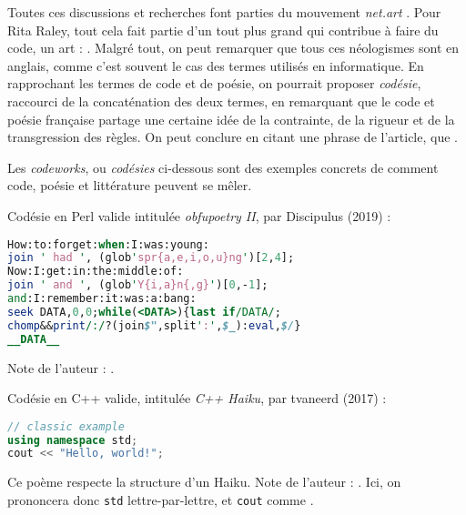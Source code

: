 \documentclass[12pt]{article} %
\begin{document}
Toutes ces discussions et recherches font parties du mouvement \textit{net.art} \cite{RRita-codework} \cite{FCramer2001}. Pour Rita Raley, tout cela fait partie d'un tout plus grand qui contribue à faire du code, un art :  \cite{RRita-codework}. Malgré tout, on peut remarquer que tous ces néologismes sont en anglais, comme c'est souvent le cas des termes utilisés en informatique. En rapprochant les termes de code et de poésie, on pourrait proposer \textit{codésie}, raccourci de la concaténation des deux termes, en remarquant que le code et poésie française partage une certaine idée de la contrainte, de la rigueur et de la transgression des règles. On peut conclure en citant une phrase de l'article, que   \cite{NouvelObs-codepoesie}.

Les \textit{codeworks}, ou \textit{codésies} ci-dessous sont des exemples concrets de comment code, poésie et littérature peuvent se mêler.

Codésie en Perl valide intitulée \textit{obfupoetry II}, par Discipulus (2019) :
\begin{lstlisting}[language=Perl, caption={Obfupoetry II}, label={codework:obfupoetry}]
How:to:forget:when:I:was:young:
join ' had ', (glob'spr{a,e,i,o,u}ng')[2,4];
Now:I:get:in:the:middle:of:
join ' and ', (glob'Y{i,a}n{,g}')[0,-1];
and:I:remember:it:was:a:bang:
seek DATA,0,0;while(<DATA>){last if/DATA/;
chomp&&print/:/?(join$",split':',$_):eval,$/}
__DATA__
\end{lstlisting}
Note de l'auteur :  \cite{codework-obfupoetryII}.

Codésie en C++ valide, intitulée \textit{C++ Haiku}, par tvaneerd (2017) :
\begin{lstlisting}[language=C++, caption={C++ Haiku}, label={codework:cpp-poem-haiku}]
// classic example
using namespace std;
cout << "Hello, world!";
\end{lstlisting}
Ce poème respecte la structure d'un Haiku. Note de l'auteur : . Ici, on prononcera donc \verb|std| lettre-par-lettre, et \verb|cout| comme  \cite{reddit-cpp-poem}.
\end{document}
